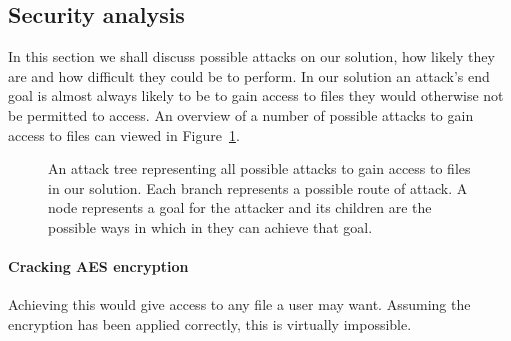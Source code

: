 \documentclass[12pt, titlepage]{article}
\begin{document}
\subsection{Security analysis}
In this section we shall discuss possible attacks on our solution, how likely they are and how difficult they could be to perform.
\newline \indent In our solution an attack's end goal is almost always likely to be to gain access to files they would otherwise not be permitted to access.
\newline \indent An overview of a number of possible attacks to gain access to files can viewed in Figure~\ref{fig:attackTree}.

\begin{landscape}
\begin{figure}

\caption{An attack tree representing all possible attacks to gain access to files in our solution. Each branch represents a possible route of attack. A node represents a goal for the attacker and its children are the possible ways in which in they can achieve that goal.}
\label{fig:attackTree}
\end{figure}
\end{landscape}

\paragraph*{Cracking AES encryption} Achieving this would give access to any file a user may want. Assuming the encryption has been applied correctly, this is virtually impossible.
\end{document}
